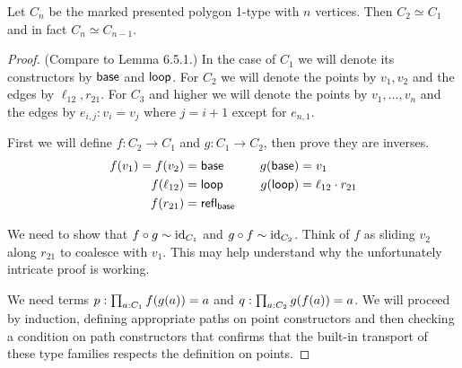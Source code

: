 \begin{mylemma}\label{lem:addpoints}
Let \( C_n \) be the marked presented polygon 1-type with \( n \) vertices. Then \( C_2\simeq C_1 \) and in fact \( C_n\simeq C_{n-1} \).
\end{mylemma}
\begin{proof}
(Compare to \cite{hottbook} Lemma 6.5.1.) In the case of \( C_1 \) we will denote its constructors by \( \mathsf{base} \) and \( \mathsf{loop} \). For \( C_2 \) we will denote the points by \( v_1, v_2 \) and the edges by \( \ell_{12}, r_{21} \). For \( C_3 \) and higher we will denote the points by \( v_1,\ldots,v_n \) and the edges by \( e_{i,j}:v_i=v_j \) where \( j=i+1 \) except for \( e_{n,1} \). 

First we will define \( f:C_2\to C_1 \) and \( g:C_1\to C_2 \), then prove they are inverses.
\begin{align*}
f(v_1)=f(v_2)&=\mathsf{base} &\quad g(\mathsf{base})&=v_1\\
f(\ell_{12})&=\mathsf{loop}&\quad g(\mathsf{loop})&=\ell_{12}\cdot r_{21}\\
f(r_{21}) &= \mathsf{refl}_{\mathsf{base}}& & \\
\end{align*}

We need to show that \( f\circ g\sim \text{id}_{C_1} \) and \( g\circ f\sim\text{id}_{C_2} \).
Think of \( f \) as sliding \( v_2 \) along \( r_{21} \) to coalesce with \( v_1 \). This may help understand why the unfortunately intricate proof is working.

We need terms \( p:\prod_{a:C_1}f(g(a))=a \) and \( q:\prod_{a:C_2}g(f(a))=a \). We will proceed by induction, defining appropriate paths on point constructors and then checking a condition on path constructors that confirms that the built-in transport of these type families respects the definition on points.


\end{proof}
